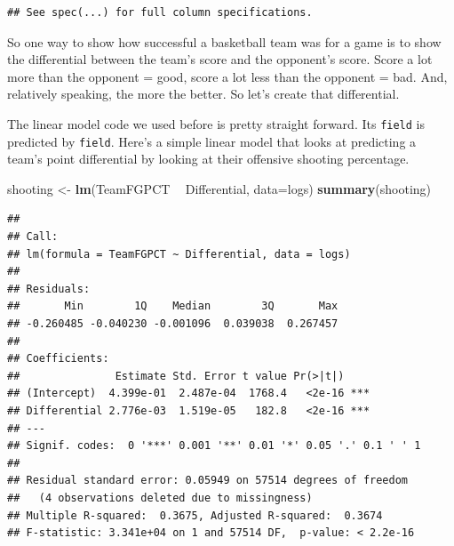 \documentclass[]{book}
\newenvironment{Shaded}{\begin{snugshade}}{\end{snugshade}}
\newcommand{\DataTypeTok}[1]{\textcolor[rgb]{0.13,0.29,0.53}{#1}}
\newcommand{\KeywordTok}[1]{\textcolor[rgb]{0.13,0.29,0.53}{\textbf{#1}}}
\newcommand{\NormalTok}[1]{#1}
\newcommand{\OperatorTok}[1]{\textcolor[rgb]{0.81,0.36,0.00}{\textbf{#1}}}
\newcommand{\StringTok}[1]{\textcolor[rgb]{0.31,0.60,0.02}{#1}}
\begin{document}
\begin{verbatim}
## See spec(...) for full column specifications.
\end{verbatim}

So one way to show how successful a basketball team was for a game is to show the differential between the team's score and the opponent's score. Score a lot more than the opponent = good, score a lot less than the opponent = bad. And, relatively speaking, the more the better. So let's create that differential.

\begin{Shaded}
\end{Shaded}

The linear model code we used before is pretty straight forward. Its \texttt{field} is predicted by \texttt{field}. Here's a simple linear model that looks at predicting a team's point differential by looking at their offensive shooting percentage.

\begin{Shaded}
\begin{Highlighting}[]
\NormalTok{shooting <-}\StringTok{ }\KeywordTok{lm}\NormalTok{(TeamFGPCT }\OperatorTok{~}\StringTok{ }\NormalTok{Differential, }\DataTypeTok{data=}\NormalTok{logs)}
\KeywordTok{summary}\NormalTok{(shooting)}
\end{Highlighting}
\end{Shaded}

\begin{verbatim}
## 
## Call:
## lm(formula = TeamFGPCT ~ Differential, data = logs)
## 
## Residuals:
##       Min        1Q    Median        3Q       Max 
## -0.260485 -0.040230 -0.001096  0.039038  0.267457 
## 
## Coefficients:
##               Estimate Std. Error t value Pr(>|t|)    
## (Intercept)  4.399e-01  2.487e-04  1768.4   <2e-16 ***
## Differential 2.776e-03  1.519e-05   182.8   <2e-16 ***
## ---
## Signif. codes:  0 '***' 0.001 '**' 0.01 '*' 0.05 '.' 0.1 ' ' 1
## 
## Residual standard error: 0.05949 on 57514 degrees of freedom
##   (4 observations deleted due to missingness)
## Multiple R-squared:  0.3675, Adjusted R-squared:  0.3674 
## F-statistic: 3.341e+04 on 1 and 57514 DF,  p-value: < 2.2e-16
\end{verbatim}
\end{document}
